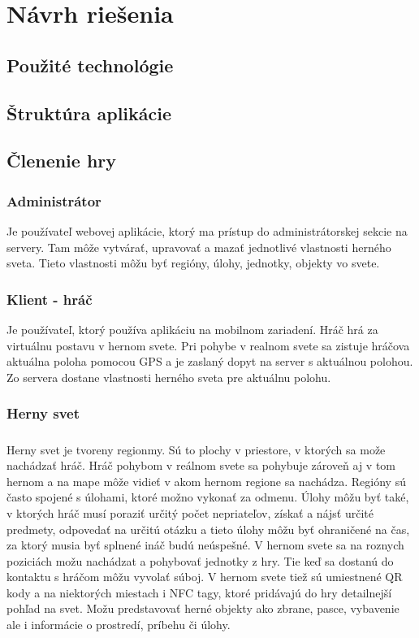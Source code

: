 \chapter{Návrh riešenia}


\section{Použité technológie}


\section{Štruktúra aplikácie}


\section{Členenie hry}
\subsection{Administrátor}
Je používateľ webovej aplikácie, ktorý ma prístup do administrátorskej sekcie na servery. Tam môže vytvárať, upravovať a mazať jednotlivé vlastnosti herného sveta. Tieto vlastnosti môžu byť regióny, úlohy, jednotky, objekty vo svete. 

\subsection{Klient - hráč}
Je používateľ, ktorý používa aplikáciu na mobilnom zariadení. Hráč hrá za virtuálnu postavu v hernom svete. Pri pohybe v realnom svete sa zistuje hráčova aktuálna poloha pomocou GPS a je zaslaný dopyt na server s aktuálnou polohou. Zo servera dostane vlastnosti herného sveta pre aktuálnu polohu.

\subsection{Herny svet}
\paragraph{}
Herny svet je tvoreny regionmy. Sú to plochy v priestore, v ktorých sa može nachádzať hráč. Hráč pohybom v reálnom svete sa pohybuje zároveň aj v tom hernom a na mape môže vidieť v akom hernom regione sa nachádza. Regióny sú často spojené s úlohami, ktoré možno vykonať za odmenu. Úlohy môžu byť také, v ktorých hráč musí poraziť určitý počet nepriateľov, získať a nájsť určité predmety, odpovedať na určitú otázku a tieto úlohy môžu byť ohraničené na čas, za ktorý musia byť splnené ináč budú neúspešné. V hernom svete sa na roznych poziciách možu nachádzat a pohybovať jednotky z hry. Tie keď sa dostanú do kontaktu s hráčom môžu vyvolať súboj. V hernom svete tiež sú umiestnené QR kody a na niektorých miestach i NFC tagy, ktoré pridávajú do hry detailnejší pohľad na svet. Možu predstavovať herné objekty ako zbrane, pasce, vybavenie ale i informácie o prostredí, príbehu či úlohy. 

